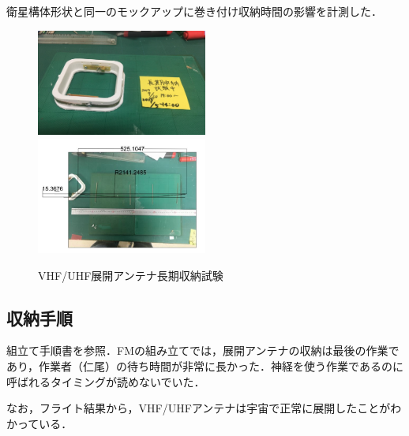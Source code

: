 衛星構体形状と同一のモックアップに巻き付け収納時間の影響を計測した．
\begin{figure}[H]
	\centering
	\includegraphics[width=0.5\textwidth]{03/fig/3-8-9b.jpg}
	\includegraphics[width=0.5\textwidth]{03/fig/3-8-10.jpg}
	\caption{VHF/UHF展開アンテナ長期収納試験}
	\label{fig3-8-10}
\end{figure}

\subsection{収納手順}

組立て手順書を参照．FMの組み立てでは，展開アンテナの収納は最後の作業であり，作業者（仁尾）の待ち時間が非常に長かった．神経を使う作業であるのに呼ばれるタイミングが読めないでいた．

なお，フライト結果から，VHF/UHFアンテナは宇宙で正常に展開したことがわかっている．



